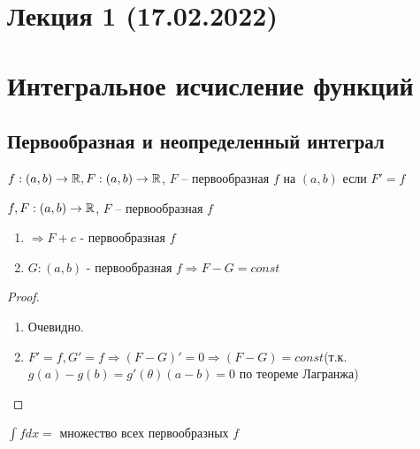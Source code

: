 \section*{Лекция 1 (17.02.2022)}
\section{Интегральное исчисление функций}
\subsection{Первообразная и неопределенный интеграл}

\begin{definition}
    $f : (a, b) \rightarrow \mathbb{R}, F : (a, b) \rightarrow \mathbb{R}$, $F$ -- первообразная $f$ на $(a, b)$ если $F' = f$
\end{definition}


\begin{theorem}
    $f, F : (a, b) \rightarrow \mathbb{R}$, $F$ -- первообразная $f$ 
    \begin{enumerate}
    \item $\Rightarrow F + c$ - первообразная $f$
    \item $G : (a,b)$ - первообразная $f \Rightarrow F - G = const$ 
    \end{enumerate}
\end{theorem}

\begin{proof} \quad
    \begin{enumerate}
        \item Очевидно.
        \item $F' = f, G' = f \Rightarrow (F - G)' = 0 \Rightarrow (F - G) = const$(т.к. $g(a) - g(b) = g'(\theta)(a - b) = 0$ 
        по теореме Лагранжа)
    \end{enumerate}
\end{proof}

\begin{definition}
    $ \int f dx = $ {множество всех первообразных $f$} 
\end{definition}


